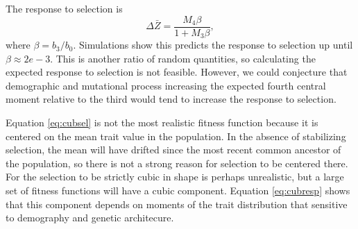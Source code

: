 The response to selection is
\begin{equation}
  \label{eq:cubresp}
  \Delta \bar{Z} = \frac{M_4\beta}{1 + M_3\beta},
\end{equation}
where $\beta=b_3/b_0$. Simulations show this predicts the response to selection
up until $\beta\approx 2e-3$. This is another ratio of random quantities, so
calculating the expected response to selection is not feasible. However, we
could conjecture that demographic and mutational process increasing the expected
fourth central moment relative to the third would tend to increase the response
to selection.

Equation \eqref{eq:cubsel} is not the most realistic fitness function because it
is centered on the mean trait value in the population. In the absence of
stabilizing selection, the mean will have drifted since the most recent common
ancestor of the population, so there is not a strong reason for selection to be
centered there. For the selection to be strictly cubic in shape is perhaps
unrealistic, but a large set of fitness functions will have a cubic component.
Equation \eqref{eq:cubresp} shows that this component depends on moments of the
trait distribution that sensitive to demography and genetic architecure.
